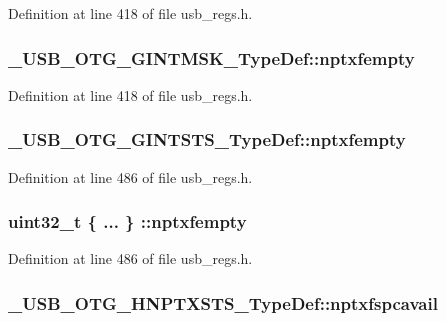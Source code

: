 Definition at line 418 of file usb\-\_\-regs.\-h.

\hypertarget{group___u_s_b___o_t_g___d_r_i_v_e_r_gad29b8a77aebfac3c51fd12427d726587}{
\subsubsection[{nptxfempty}]{ \-\_\-\-U\-S\-B\-\_\-\-O\-T\-G\-\_\-\-G\-I\-N\-T\-M\-S\-K\-\_\-\-Type\-Def\-::nptxfempty}}\label{group___u_s_b___o_t_g___d_r_i_v_e_r_gad29b8a77aebfac3c51fd12427d726587}


Definition at line 418 of file usb\-\_\-regs.\-h.

\hypertarget{group___u_s_b___o_t_g___d_r_i_v_e_r_ga7f95aea2bd53e9566d83818c6062f1ca}{
\subsubsection[{nptxfempty}]{ \-\_\-\-U\-S\-B\-\_\-\-O\-T\-G\-\_\-\-G\-I\-N\-T\-S\-T\-S\-\_\-\-Type\-Def\-::nptxfempty}}\label{group___u_s_b___o_t_g___d_r_i_v_e_r_ga7f95aea2bd53e9566d83818c6062f1ca}


Definition at line 486 of file usb\-\_\-regs.\-h.

\hypertarget{group___u_s_b___o_t_g___d_r_i_v_e_r_ga827bad9abe0b8c20ce91a7dd6fc5483d}{
\subsubsection[{nptxfempty}]{\setlength{\rightskip}{0pt plus 5cm}uint32\-\_\-t \{ ... \} \-::nptxfempty}}\label{group___u_s_b___o_t_g___d_r_i_v_e_r_ga827bad9abe0b8c20ce91a7dd6fc5483d}


Definition at line 486 of file usb\-\_\-regs.\-h.

\hypertarget{group___u_s_b___o_t_g___d_r_i_v_e_r_gac775d30f4d6ea8497522eea1c8f1dd99}{
\subsubsection[{nptxfspcavail}]{ \-\_\-\-U\-S\-B\-\_\-\-O\-T\-G\-\_\-\-H\-N\-P\-T\-X\-S\-T\-S\-\_\-\-Type\-Def\-::nptxfspcavail}}\label{group___u_s_b___o_t_g___d_r_i_v_e_r_gac775d30f4d6ea8497522eea1c8f1dd99}


